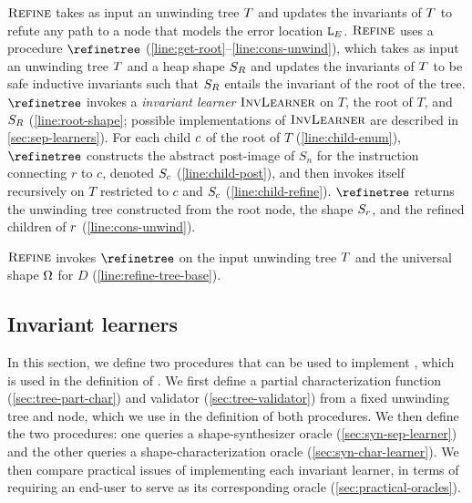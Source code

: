 $\textsc{Refine}$ takes as input an unwinding tree $T$ and updates the
invariants of $T$ to refute any path to a node that models the
error location $\mathtt{L}_E$.
$\textsc{Refine}$ uses a procedure $\refinetree$
(\autoref{line:get-root}--\autoref{line:cons-unwind}), which takes as
input an unwinding tree $T$ and a heap shape $S_R$ and
updates the invariants of $T$ to be safe inductive invariants
such that $S_R$ entails the invariant of the root of the tree.
%
$\refinetree$ invokes a \emph{invariant learner} $\textsc{InvLearner}$ on $T$,
the root of $T$, and $S_R$ (\autoref{line:root-shape};
possible implementations of $\textsc{InvLearner}$ are described in
\autoref{sec:sep-learners}).
%
For each child $c$ of the root of $T$
(\autoref{line:child-enum}), $\refinetree$ constructs the abstract
post-image of $S_n$ for the instruction connecting $r$ to $c$, denoted
$S_c$ (\autoref{line:child-post}), and then invokes itself
recursively on $T$ restricted to $c$ and $S_c$
(\autoref{line:child-refine}).
%
$\refinetree$ returns the unwinding tree constructed from the root
node, the shape $S_r$, and the refined children of $r$
(\autoref{line:cons-unwind}).

$\textsc{Refine}$ invokes $\refinetree$ on the input unwinding tree $T$
and the universal shape $\Omega$ for $D$
(\autoref{line:refine-tree-base}).

\subsection{Invariant learners}
\label{sec:sep-learners}
%
In this section, we define two procedures that can be used to
implement \seplearner, which is used in the definition of .
%
We first define a partial characterization function
(\autoref{sec:tree-part-char}) and validator
(\autoref{sec:tree-validator}) from a fixed unwinding tree and node,
which we use in the definition of both procedures.
%
We then define the two procedures: one queries a shape-synthesizer
oracle (\autoref{sec:syn-sep-learner}) and the other queries a
shape-characterization oracle (\autoref{sec:syn-char-learner}).
%
We then compare practical issues of implementing each invariant
learner, in terms of requiring an end-user to serve as its
corresponding oracle (\autoref{sec:practical-oracles}).

